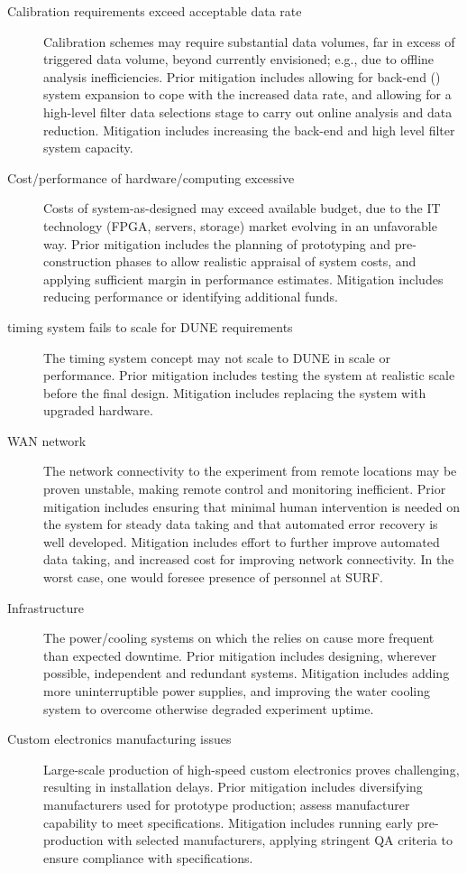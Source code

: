 \begin{description}
\item[Calibration requirements exceed acceptable data rate]
  Calibration schemes may require substantial data 
volumes, far in excess of triggered data volume, beyond currently
envisioned; e.g., due to offline analysis inefficiencies. Prior
mitigation includes allowing for back-end () system expansion to cope
with the increased data rate, and allowing for a high-level filter data
selections stage to carry out online analysis and data
reduction. Mitigation includes increasing the back-end  and high
level filter system capacity. 

\item[Cost/performance of hardware/computing excessive] Costs of
  system-as-designed may exceed available budget, due to the IT technology (FPGA, servers, storage) market evolving in an unfavorable way. Prior mitigation
  includes the planning of prototyping and pre-construction phases to allow
  realistic appraisal of system costs, and applying sufficient margin
  in performance estimates.  Mitigation includes reducing performance
  or identifying additional funds. 


\item[ timing system fails to scale for DUNE requirements] The  timing system concept may
  not scale to DUNE in scale or performance.  Prior mitigation
  includes testing the system at realistic scale before the final
  design. Mitigation includes replacing the system with upgraded
  hardware.

\item[WAN network] The network connectivity to the experiment from
  remote locations may be proven unstable, making remote control and monitoring
  inefficient. Prior mitigation includes ensuring that minimal human intervention
  is needed on the system for steady data taking and that automated
  error recovery is well developed. Mitigation includes effort to further
  improve automated data taking, and increased cost for improving network
  connectivity. In the worst case, one would foresee presence of personnel at SURF.

\item[Infrastructure] The power/cooling systems on which the 
  relies on cause more frequent than expected downtime. Prior
  mitigation includes designing, wherever possible, independent and redundant
  systems. Mitigation includes adding more uninterruptible power
  supplies, and improving the water cooling system to overcome otherwise
  degraded experiment uptime. 

\item[Custom electronics manufacturing issues] Large-scale production of high-speed custom
  electronics proves challenging, resulting in  installation delays. Prior mitigation includes diversifying manufacturers used for prototype production; assess manufacturer capability to meet specifications.  Mitigation includes running early pre-production with selected manufacturers, applying stringent QA criteria to ensure compliance with specifications.

\end{description}
